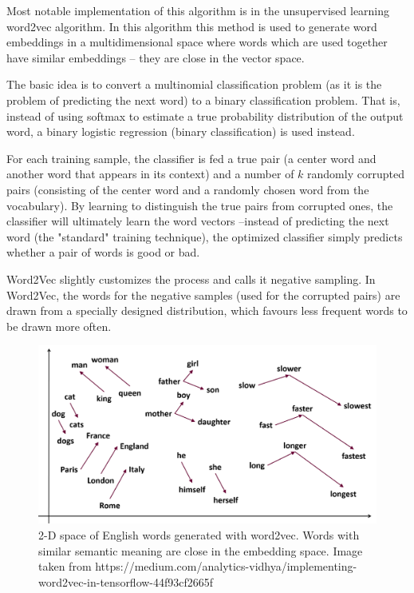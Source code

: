 \documentclass[b5paper]{book}
\begin{document}
Most notable implementation of this algorithm is in the unsupervised learning word2vec algorithm. In this algorithm this method is used to generate word embeddings in a multidimensional space where words which are used together have similar embeddings -- they are close in the vector space. 

The basic idea is to convert a multinomial classification problem (as it is the problem of predicting the next word) to a binary classification problem. That is, instead of using softmax to estimate a true probability distribution of the output word, a binary logistic regression (binary classification) is used instead.

For each training sample, the classifier is fed a true pair (a center word and another word that appears in its context) and a number of \(k\) randomly corrupted pairs (consisting of the center word and a randomly chosen word from the vocabulary). By learning to distinguish the true pairs from corrupted ones, the classifier will ultimately learn the word vectors --instead of predicting the next word (the "standard" training technique), the optimized classifier simply predicts whether a pair of words is good or bad.

Word2Vec slightly customizes the process and calls it negative sampling. In Word2Vec, the words for the negative samples (used for the corrupted pairs) are drawn from a specially designed distribution, which favours less frequent words to be drawn more often.

\begin{figure}
    \centering
    \includegraphics[scale=0.2]{figures/word2vec.png}    \caption{2-D space of English words generated with word2vec. Words with similar semantic meaning are close in the embedding space. Image taken from https://medium.com/analytics-vidhya/implementing-word2vec-in-tensorflow-44f93cf2665f}
    \label{fig:word2vec}
\end{figure}
\end{document}
